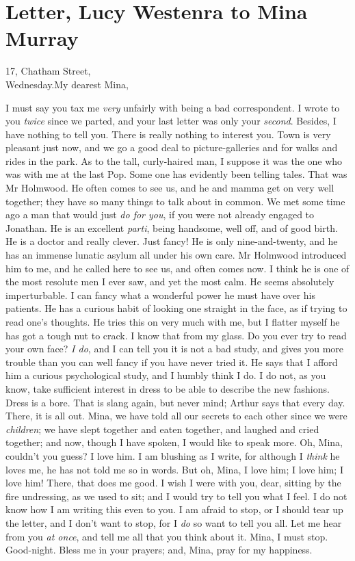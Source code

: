 \section{Letter, Lucy Westenra to Mina Murray}

\begin{mail}{17, Chatham Street,\\Wednesday.}{My dearest Mina,}


I must say you tax me \textit{very} unfairly with being a bad correspondent. I wrote to you \textit{twice} since we parted, and your last letter was only your \textit{second}. Besides, I have nothing to tell you. There is really nothing to interest you. Town is very pleasant just now, and we go a good deal to picture-galleries and for walks and rides in the park. As to the tall, curly-haired man, I suppose it was the one who was with me at the last Pop. Some one has evidently been telling tales. That was Mr Holmwood. He often comes to see us, and he and mamma get on very well together; they have so many things to talk about in common. We met some time ago a man that would just \textit{do for you}, if you were not already engaged to Jonathan. He is an excellent \textit{parti}, being handsome, well off, and of good birth. He is a doctor and really clever. Just fancy! He is only nine-and-twenty, and he has an immense lunatic asylum all under his own care. Mr Holmwood introduced him to me, and he called here to see us, and often comes now. I think he is one of the most resolute men I ever saw, and yet the most calm. He seems absolutely imperturbable. I can fancy what a wonderful power he must have over his patients. He has a curious habit of looking one straight in the face, as if trying to read one's thoughts. He tries this on very much with me, but I flatter myself he has got a tough nut to crack. I know that from my glass. Do you ever try to read your own face? \textit{I do}, and I can tell you it is not a bad study, and gives you more trouble than you can well fancy if you have never tried it. He says that I afford him a curious psychological study, and I humbly think I do. I do not, as you know, take sufficient interest in dress to be able to describe the new fashions. Dress is a bore. That is slang again, but never mind; Arthur says that every day. There, it is all out. Mina, we have told all our secrets to each other since we were \textit{children}; we have slept together and eaten together, and laughed and cried together; and now, though I have spoken, I would like to speak more. Oh, Mina, couldn't you guess? I love him. I am blushing as I write, for although I \textit{think} he loves me, he has not told me so in words. But oh, Mina, I love him; I love him; I love him! There, that does me good. I wish I were with you, dear, sitting by the fire undressing, as we used to sit; and I would try to tell you what I feel. I do not know how I am writing this even to you. I am afraid to stop, or I should tear up the letter, and I don't want to stop, for I \textit{do} so want to tell you all. Let me hear from you \textit{at once}, and tell me all that you think about it. Mina, I must stop. Good-night. Bless me in your prayers; and, Mina, pray for my happiness.


\end{mail}

